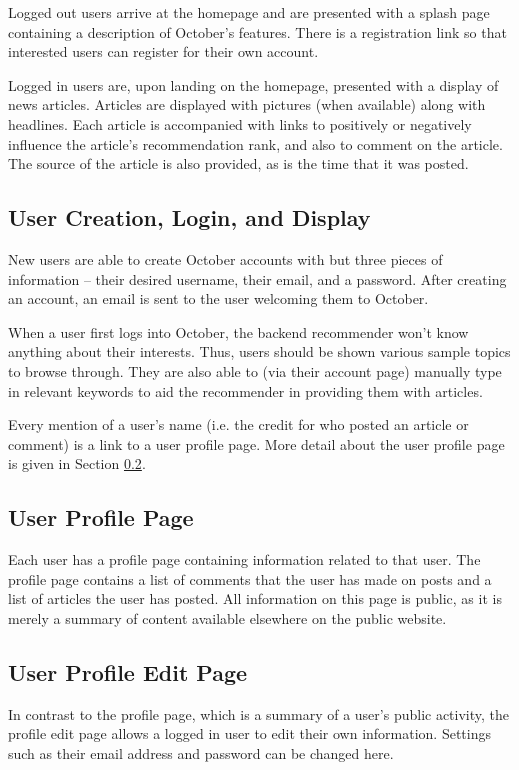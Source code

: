 \documentclass[11pt,letterpaper]{article}
\begin{document}
Logged out users arrive at the homepage and are presented with a splash page containing a description of October's features.
There is a registration link so that interested users can register for their own account.

Logged in users are, upon landing on the homepage, presented with a display of news articles.
Articles are displayed with pictures (when available) along with headlines.
Each article is accompanied with links to positively or negatively influence the article's recommendation rank, and also to comment on the article.
The source of the article is also provided, as is the time that it was posted.

\subsection{User Creation, Login, and Display}
New users are able to create October accounts with but three pieces of information --  their desired username, their email, and a password.
After creating an account, an email is sent to the user welcoming them to October.

When a user first logs into October, the backend recommender won't know anything about their interests.
Thus, users should be shown various sample topics to browse through.
They are also able to (via their account page) manually type in relevant keywords to aid the recommender in providing them with articles.

Every mention of a user's name (i.e. the credit for who posted an article or comment) is a link to a user profile page. More detail about the user profile page is given in Section \ref{sec:profilepage}.

\subsection{User Profile Page}
\label{sec:profilepage}
Each user has a profile page containing information related to that user.
The profile page contains a list of comments that the user has made on posts and a list of articles the user has posted.
All information on this page is public, as it is merely a summary of content available elsewhere on the public website.

\subsection{User Profile Edit Page}
In contrast to the profile page, which is a summary of a user's public activity, the profile edit page allows a logged in user to edit their own information.
Settings such as their email address and password can be changed here.
\end{document}

